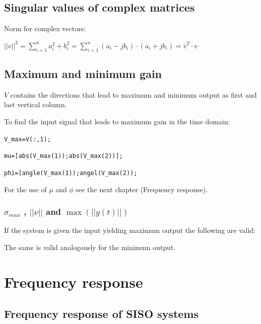 \documentclass[10pt,a4paper]{scrartcl}
\begin{document}
\begin{multicols*}{3}
	
	\subsection*{Singular values of complex matrices}
	
	Norm for complex vectors: 
	
	$||v||^2=\sum\limits_{i=1}^n{a_i^2+b_i^2}=\sum\limits_{i=1}^n{(a_i-jb_i)\cdot(a_i+jb_i)}=\bar{v}^T\cdot v$
	
	
	
	\subsection*{Maximum and minimum gain}
	
	$V$ contains the directions that lead to maximum and minimum output as first and last vertical column.
	
	To find the input signal that leads to maximum gain in the time domain:
	
	\verb+V_max=V(:,1);+
	
	\verb+mu=[abs(V_max(1));abs(V_max(2))];+
	
	\verb+phi=[angle(V_max(1));angel(V_max(2));+
	
	\finn
	
	For the use of $\mu$ and $\phi$ see the next chapter (Frequency response).
	
	\subsubsection{$\sigma_{max}$ , $||\nu||$ and $\max(||y(t)||)$}
	
	If the system is given the input yielding maximum output the following are valid:
	
	
	The same is valid analogously for the minimum output.
	
	\section{Frequency response}
	
	\subsection{Frequency response of SISO systems}
	

\end{multicols*}
\end{document}
